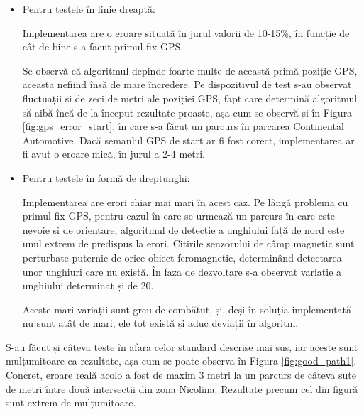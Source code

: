 \documentclass[12pt, a4paper, oneside]{article}
\begin{document}
\begin{itemize}  
\item Pentru testele în linie dreaptă:

Implementarea are o eroare situată în jurul valorii de 10-15\%, în funcție de cât de bine s-a făcut primul fix GPS.

Se observă că algoritmul depinde foarte multe de această primă poziție GPS, aceasta nefiind însă de mare încredere. Pe dispozitivul de test s-au observat fluctuații și de zeci de metri ale poziției GPS, fapt care determină algoritmul să aibă încă de la început rezultate proaste, așa cum se observă și în Figura \ref{fig:gps_error_start}, în care s-a făcut un parcurs în parcarea Continental Automotive. Dacă semanlul GPS de start ar fi fost corect, implementarea ar fi avut o eroare mică, în jurul a 2-4 metri.

\item Pentru testele în formă de dreptunghi:

Implementarea are erori chiar mai mari în acest caz. Pe lângă problema cu primul fix GPS, pentru cazul în care se urmează un parcurs în care este nevoie și de orientare, algoritmul de detecție a unghiului față de nord este unul extrem de predispus la erori. Citirile senzorului de câmp magnetic sunt perturbate puternic de orice obiect feromagnetic, determinând detectarea unor unghiuri care nu există. În faza de dezvoltare s-a observat variație a unghiului determinat și de 20\degree.

Aceste mari variații sunt greu de combătut, și, deși în soluția implementată nu sunt atât de mari, ele tot există și aduc deviații în algoritm.

\end{itemize}

S-au făcut și câteva teste în afara celor standard descrise mai sus, iar aceste sunt mulțumitoare ca rezultate, așa cum se poate observa în Figura \ref{fig:good_path1}. Concret, eroare reală acolo a fost de maxim 3 metri la un parcurs de câteva sute de metri între două intersecții din zona Nicolina. Rezultate precum cel din figură sunt extrem de mulțumitoare.
\end{document}
